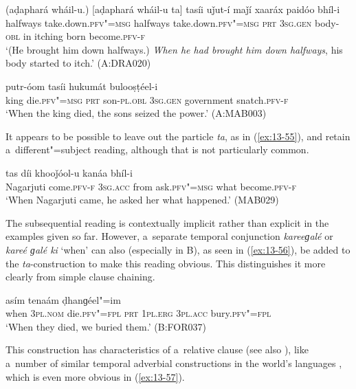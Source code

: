 \begin{exe}
\ex
\label{ex:13-53}
\gll (aḍaphará wháil-u.) [aḍaphará wháil-u ta] tasíi uǰut-í maǰí xaaráx paidóo bhíl-i \\
halfways take.down.\textsc{pfv"=msg} halfways  take.down.\textsc{pfv"=msg } \textsc{prt} \textsc{3sg.gen} body-\textsc{obl} in itching born become.\textsc{pfv-f} \\
\glt `(He brought him down halfways.) \textit{When he had brought him down halfways}, his body started to itch.' (A:DRA020)

\ex
\label{ex:13-54}
 putr-óom tasíi hukumát bulooṣṭéel-i \\
king die.\textsc{pfv"=msg} \textsc{prt} son-\textsc{pl.obl} \textsc{3sg.gen}  government snatch.\textsc{pfv-f} \\
\glt `When the king died, the sons seized the power.' (A:MAB003)
\end{exe}

It appears to be possible to leave out the particle \textit{ta}, as in (\ref{ex:13-55}), and retain a~different"=subject reading, although that is not particularly common.

\begin{exe}
\ex
\label{ex:13-55}
 tas díi khooǰóol-u kanáa bhíl-i \\
Nagarjuti come.\textsc{pfv-f} \textsc{3sg.acc} from ask.\textsc{pfv"=msg}  what become.\textsc{pfv-f} \\
\glt `When Nagarjuti came, he asked her what happened.' (MAB029) 
\end{exe}

The subsequential reading is contextually implicit rather than explicit in the examples given so far. However, a~separate temporal conjunction \textit{kareeɡalé} or \textit{kareé ɡalé ki} `when' can also (especially in B), as seen in (\ref{ex:13-56}), be added to the \textit{ta}-construction to make this reading obvious. This distinguishes it more clearly from simple clause chaining.

\begin{exe}
\ex
\label{ex:13-56}
 asím tenaám ḍhanɡéel"=im \\
when \textsc{3pl.nom} die.\textsc{pfv"=fpl} \textsc{prt} \textsc{1pl.erg} \textsc{3pl.acc} bury.\textsc{pfv"=fpl} \\
\glt `When they died, we buried them.' (B:FOR037) 
\end{exe}

This construction has characteristics of a~relative clause (see also ), like a~number of similar temporal adverbial constructions in the world's languages \citep[246--247]{thompsonetal2007}, which is even more obvious in (\ref{ex:13-57}).

